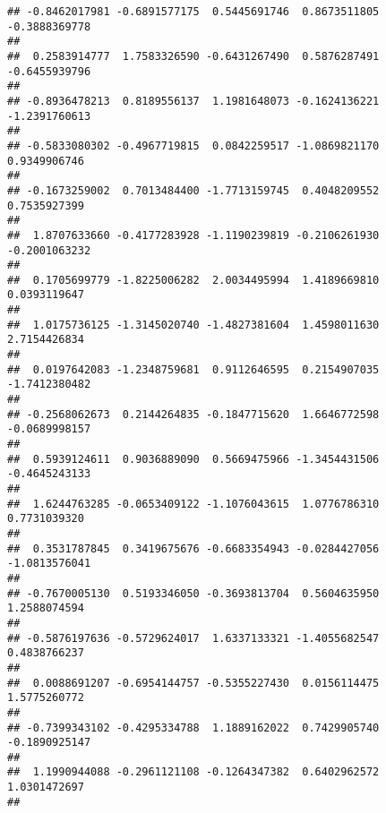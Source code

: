 \documentclass[]{article}
\begin{document}
\begin{verbatim}
## -0.8462017981 -0.6891577175  0.5445691746  0.8673511805 -0.3888369778 
##                                                                       
##  0.2583914777  1.7583326590 -0.6431267490  0.5876287491 -0.6455939796 
##                                                                       
## -0.8936478213  0.8189556137  1.1981648073 -0.1624136221 -1.2391760613 
##                                                                       
## -0.5833080302 -0.4967719815  0.0842259517 -1.0869821170  0.9349906746 
##                                                                       
## -0.1673259002  0.7013484400 -1.7713159745  0.4048209552  0.7535927399 
##                                                                       
##  1.8707633660 -0.4177283928 -1.1190239819 -0.2106261930 -0.2001063232 
##                                                                       
##  0.1705699779 -1.8225006282  2.0034495994  1.4189669810  0.0393119647 
##                                                                       
##  1.0175736125 -1.3145020740 -1.4827381604  1.4598011630  2.7154426834 
##                                                                       
##  0.0197642083 -1.2348759681  0.9112646595  0.2154907035 -1.7412380482 
##                                                                       
## -0.2568062673  0.2144264835 -0.1847715620  1.6646772598 -0.0689998157 
##                                                                       
##  0.5939124611  0.9036889090  0.5669475966 -1.3454431506 -0.4645243133 
##                                                                       
##  1.6244763285 -0.0653409122 -1.1076043615  1.0776786310  0.7731039320 
##                                                                       
##  0.3531787845  0.3419675676 -0.6683354943 -0.0284427056 -1.0813576041 
##                                                                       
## -0.7670005130  0.5193346050 -0.3693813704  0.5604635950  1.2588074594 
##                                                                       
## -0.5876197636 -0.5729624017  1.6337133321 -1.4055682547  0.4838766237 
##                                                                       
##  0.0088691207 -0.6954144757 -0.5355227430  0.0156114475  1.5775260772 
##                                                                       
## -0.7399343102 -0.4295334788  1.1889162022  0.7429905740 -0.1890925147 
##                                                                       
##  1.1990944088 -0.2961121108 -0.1264347382  0.6402962572  1.0301472697 
##                                                                       

\end{verbatim}
\end{document}
